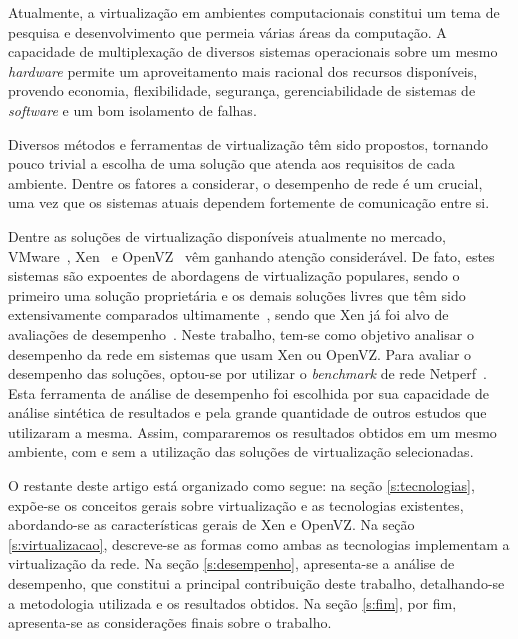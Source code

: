 \documentclass[12pt]{article}
\def\sw{\textit{software}\xspace}
\def\hw{\textit{hardware}\xspace}
\begin{document}
Atualmente, a virtualização em ambientes computacionais constitui um tema de pesquisa e desenvolvimento que permeia várias áreas da computação. A capacidade de multiplexação de diversos sistemas operacionais sobre um mesmo \hw permite um aproveitamento mais racional dos recursos disponíveis, provendo economia, flexibilidade, segurança, gerenciabilidade de sistemas de \sw e um bom isolamento de falhas.

Diversos métodos e ferramentas de virtualização têm sido propostos, tornando pouco trivial a escolha de uma solução que atenda aos requisitos de cada ambiente. Dentre os fatores a considerar, o desempenho de rede é um crucial, uma vez que os sistemas atuais dependem fortemente de comunicação entre si. 

Dentre as soluções de virtualização disponíveis atualmente no mercado, VMware~\cite{vmware}, Xen~\cite{xen} e OpenVZ~\cite{openvz} vêm ganhando atenção considerável. De fato, estes sistemas são expoentes de abordagens de virtualização populares, sendo o primeiro uma solução proprietária e os demais soluções livres que têm sido extensivamente comparados ultimamente~\cite{xenvsopenvz}, sendo que Xen já foi alvo de avaliações de desempenho~\cite{urschei2007amorvm}. Neste trabalho, tem-se como objetivo analisar o desempenho da rede em sistemas que usam Xen ou OpenVZ. Para avaliar o desempenho das soluções, optou-se por utilizar o \emph{benchmark} de rede Netperf~\cite{netperf}. Esta ferramenta de análise de desempenho foi escolhida por sua capacidade de análise sintética de resultados e pela grande quantidade de outros estudos que utilizaram a mesma. Assim, compararemos os resultados obtidos em um mesmo ambiente, com e sem a utilização das soluções de virtualização selecionadas.


O restante deste artigo está organizado como segue: na seção \ref{s:tecnologias}, expõe-se os conceitos gerais sobre virtualização e as tecnologias existentes, abordando-se as características gerais de Xen e OpenVZ. Na seção \ref{s:virtualizacao}, descreve-se as formas como ambas as tecnologias implementam a virtualização da rede. Na seção \ref{s:desempenho}, apresenta-se a análise de desempenho, que constitui a principal contribuição deste trabalho, detalhando-se a metodologia utilizada e os resultados obtidos. Na seção \ref{s:fim}, por fim, apresenta-se as considerações finais sobre o trabalho.
\end{document}
